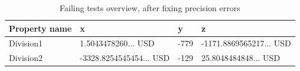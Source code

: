 \FloatBarrier
\begin{table}[!ht]
\centering
\begin{tabular}{llll}
\hline
\textbf{Property name} & \textbf{x}                               & \textbf{y} & \textbf{z}                               \\ \hline
Division1              & 1.5043478260... USD     & -779       & -1171.8869565217... USD \\
Division2              & -3328.8254545454... USD & -129       & 25.8048484848... USD    \\ \hline
\end{tabular}
\caption{Failing tests overview, after fixing precision errors}
\label{tbl:experiment2_overview_second_run}
\end{table}
\FloatBarrier

